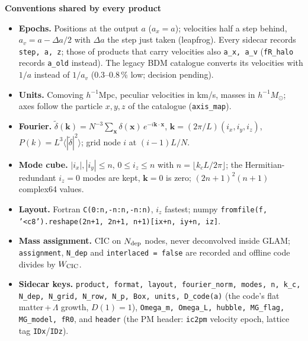 \documentclass[UTF8]{beamer}
\begin{document}
\begin{frame}{\textbf{Conventions shared by every product}}
  \footnotesize
  \begin{itemize}
    \item \textbf{Epochs.} Positions at the output $a$ ($a_x = a$); velocities half a step behind, $a_v = a - \Delta a/2$
      with $\Delta a$ the step just taken (leapfrog). Every sidecar records \texttt{step, a, z}; those of products that carry
      velocities also \texttt{a\_x, a\_v} (\texttt{fR\_halo} records \texttt{a\_old} instead). The legacy
      BDM catalogue converts its velocities with $1/a$ instead of $1/a_v$ (0.3--0.8\,\% low; decision pending).
    \item \textbf{Units.} Comoving $h^{-1}$Mpc, peculiar velocities in km/s, masses in $h^{-1}M_\odot$; axes follow the
      particle $x, y, z$ of the catalogue (\texttt{axis\_map}).
    \item \textbf{Fourier.} $\tilde\delta(\mathbf{k}) = N^{-3}\sum_{\mathbf{x}}\delta(\mathbf{x})\,e^{-i\mathbf{k}\cdot\mathbf{x}}$,
      $\mathbf{k} = (2\pi/L)(i_x, i_y, i_z)$, $P(k) = L^3\langle|\tilde\delta|^2\rangle$; grid node $i$ at $(i-1)L/N$.
    \item \textbf{Mode cube.} $|i_x|, |i_y| \le n$, $0 \le i_z \le n$ with $n = \lfloor k_c L/2\pi\rfloor$; the Hermitian-redundant
      $i_z = 0$ modes are kept, $\mathbf{k} = 0$ is zero; $(2n+1)^2(n+1)$ complex64 values.
    \item \textbf{Layout.} Fortran \texttt{C(0:n,-n:n,-n:n)}, $i_z$ fastest; numpy
      \texttt{fromfile(f, '<c8').reshape(2n+1, 2n+1, n+1)[ix+n, iy+n, iz]}.
    \item \textbf{Mass assignment.} CIC on $N_{\rm dep}$ nodes, never deconvolved inside GLAM; \texttt{assignment},
      \texttt{N\_dep} and \texttt{interlaced = false} are recorded and offline code divides by $W_{\rm CIC}$.
    \item \textbf{Sidecar keys.} \texttt{product, format, layout, fourier\_norm, modes, n, k\_c, N\_dep, N\_grid, N\_row, N\_p,
      Box, units, D\_code(a)} (the code's flat matter\,+\,$\Lambda$ growth, $D(1) = 1$), \texttt{Omega\_m, Omega\_L, hubble,
      MG\_flag, MG\_model, fR0}, and \texttt{header} (the PM header: \texttt{ic2pm} velocity epoch, lattice tag \texttt{IDx}/\texttt{IDz}).
  \end{itemize}
\end{frame}
\end{document}
